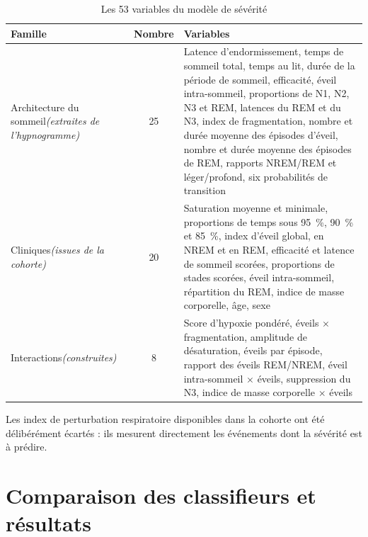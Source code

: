 \begin{table}[H]
\centering
\caption{Les 53 variables du modèle de sévérité}
\label{tab:ann-variables}
\small
\begin{tabular}{@{}lcL{9.2cm}@{}}
\toprule
\textbf{Famille} & \textbf{Nombre} & \textbf{Variables} \\
\midrule
Architecture du sommeil\newline\emph{(extraites de l'hypnogramme)} & 25 &
Latence d'endormissement, temps de sommeil total, temps au lit, durée de la période de
sommeil, efficacité, éveil intra-sommeil, proportions de N1, N2, N3 et REM, latences
du REM et du N3, index de fragmentation, nombre et durée moyenne des épisodes d'éveil,
nombre et durée moyenne des épisodes de REM, rapports NREM/REM et léger/profond, six
probabilités de transition \\
\addlinespace[3pt]
Cliniques\newline\emph{(issues de la cohorte)} & 20 &
Saturation moyenne et minimale, proportions de temps sous \SI{95}{\percent},
\SI{90}{\percent} et \SI{85}{\percent}, index d'éveil global, en NREM et en REM,
efficacité et latence de sommeil scorées, proportions de stades scorées, éveil
intra-sommeil, répartition du REM, indice de masse corporelle, âge, sexe \\
\addlinespace[3pt]
Interactions\newline\emph{(construites)} & 8 &
Score d'hypoxie pondéré, éveils $\times$ fragmentation, amplitude de désaturation,
éveils par épisode, rapport des éveils REM/NREM, éveil intra-sommeil $\times$ éveils,
suppression du N3, indice de masse corporelle $\times$ éveils \\
\bottomrule
\end{tabular}
\end{table}

Les index de perturbation respiratoire disponibles dans la cohorte ont été
délibérément écartés : ils mesurent directement les événements dont la sévérité est à
prédire.

\section{Comparaison des classifieurs et résultats}

